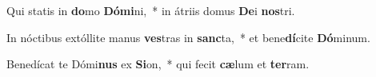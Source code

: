 \item Qui statis in \textbf{do}mo \textbf{Dó}\textbf{mi}ni,~* in átriis domus \textbf{De}i \textbf{nos}tri.
\item In nóctibus extóllite manus \textbf{ves}tras in \textbf{sanc}ta,~* et bene\textbf{dí}cite \textbf{Dó}minum.
\item Benedícat te Dómi\textbf{nus} ex \textbf{Si}on,~* qui fecit \textbf{cæ}lum et \textbf{ter}ram.
